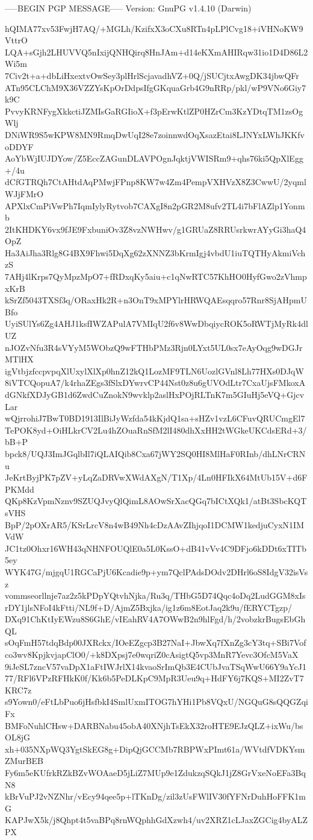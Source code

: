 -----BEGIN PGP MESSAGE-----
Version: GnuPG v1.4.10 (Darwin)

hQIMA77xv53FwjH7AQ/+MGLh/KzifxX3oCXu8RTn4pLPlCvg18+iVHNoKW9VttrO
LQA+sGjh2LHUVVQ5nIxijQNHQirq8HnJAm+d14eKXmAHIRqw31io1D4D86L2Wi5m
7Civ2t+a+dbLiHxextvOwSey3plHrlScjavadhVZ+0Q/jSUCjtxAwgDK34jbwQFr
ATn95CLChM9X36VZZYsKpOrDdpsIfgGKquaGrb4G9nRRp/pkl/wP9VNo6Giy7k9C
PvvyKRNFygXkkctiJZMIsGaRGIioX+f3pErwKtlZP0HZrCm3KzYDtqTM1zsOgWlj
DNiWR9S5wKPW8MN9RmqDwUqI28e7zoinnwdOqXsazEtai8LJNYxLWhJKKfvoDDYF
AoYbWjIUJDYow/Z5EccZAGunDLAVPOgnJqktjVWISRm9+qhs76ki5QpXlEgg+/4u
dCfGTRQh7CtAHtdAqPMwjFPnp8KW7w4Zm4PempVXHVzX8Z3CwwU/2yqmlWJjFMrO
APXlxCmPiVwPh7IqmIylyRytvob7CAXgI8n2pGR2M8ufv2TL4i7bFlAZlp1Yonmb
2ItKHDKY6vx9fJE9FxbuniOv3Z8vzNWHwv/g1GRUaZ8RRUsrkwrAYyGi3haQ4OpZ
Ha3AiJha3Rlg8G4BX9Fhwi5DqXg62zXNNZ3bKrmIgj4vbdU1iuTQTHyAkmiVchzS
7AHj4lKrps7QyMpzMpO7+fRDxqKy5aiu+c1qNwRTC57KhHO0HyfGwo2zVhmpxKrB
kSrZf5043TXSf3q/ORaxHk2R+n3OnT9xMPYlrHRWQAEsqqro57Rnr8SjAHpmUBfo
UyiSUlYs6Zg4AHJ1ksfIWZAPulA7VMIqU2f6v8WwDbqiycROK5oRWTjMyRk4dlUZ
nJOZvNfu3R4sVYyM5WObzQ9wFTHbPMz3Rjn0LYxt5UL0sx7eAyOqg9wDGJrMTlHX
igVtbjzfccpvpqXlUxylXlXp0hnZ12kQ1LozMF9TLN6UozlGVnl8Lh77HXs0DJqW
8iVTCQopuA7/k4rhaZEgs3fSlxDYwrvCP44Nst0z8u6gUVOdLtr7CxaUjsFMkoxA
dGNkfXDJyGB1d6ZwdCuZnokN9wvklp2aslHxPOjRLTnK7m5GIuHj5eVQ+GjcvLar
wQjrrohiJ7BwT0BD1913IlBiJyWzfda54kKjdQ1sa+sHZv1vzL6CFuvQRUCmgEl7
TePOK8yd+OiHLkrCV2Lu4hZOuaRnSfM2lI480dhXxHH2tWGkeUKCdsERd+3/bB+P
bpck8/UQJ3ImJGqlbIl7iQLAIQib8Cxa67jWY2SQ0HI8MlHaF0RInb/dhLNrCRNu
JeKrtByjPK7pZV+yLqZaDRVwXWdAXgN/T1Xp/4Ln0HFIkX64MtUb15V+d6FPKMdd
QKp8KzVpmNznv9SZUQJvyQlQimL8AOwSrXacQGq7bICtXQk1/atBt3SbcKQTsVHS
BpP/2pOXrAR5/KSrLrcV8n4wB49Nh4cDzAAvZIhjqoI1DCMW1kedjuCyxN1IMVdW
JC1tz0Ohxr16WH43qNHNFOUQlE0a5L0KssO+dB41vVv4C9DFjo6kDDt6xTITb5ey
WYK47G/mjgqU1RGCaPjU6Kcadie9p+ym7QclPAdsDOdv2DHrl6oS8IdgV32isVsz
vommseorllnje7az2z5kPDpYQtvhNjka/Ru3q/THbG5D74Qqc4oDq2LudGGM8xIs
rDY1jlsNFoI4kFtti/NL9f+D/AjmZ5Bxjka/ig1z6m8EotJaq2k9u/fERYCTgzp/
DXq91ChKtIyEWzu8S6GhE/vIEahRV4A7OWwB2n9hlFgd/h/2vobzkrBugsEbGhQL
sOqFmH57tdqBdp00JXRckx/IOeEZgcp3B27NaI+JbwXq7fXnZg3cY3tq+SBi7Vof
co3wv8KpjkvjapClO0/+k8DXpsj7e0wqriZ0cAsigtQ5vp3MnR7Yevc3OfcM5VaX
9iJeSL7zncV57vaDpX1aFtIWJrlX14kvaoSrImQb3E4CUbJvaTSqWwU66Y9aYcJ1
77/RFl6VPzRFHkK0f/Kk6b5PeDLKpC9MpR3Ueu9q+HdFY6j7KQS+MI2ZvT7KRC7z
s9Yown0/eFtLbPuo6jHsfbkI4SmlUxmITOG7hYHi1Pb8VQxU/NGQuG8sQQGZqiFx
BMFoNuhlCHsw+DARBNabu45obA40XNjhTsEkX32roHTE9EJzQLZ+ixWu/bsOL8jG
xh+035NXpWQ3YgtSkEG8g+DipQjGCCMb7RBPWxPImt61a/WVtdfVDKYsmZMurBEB
Fy6m5eKUfrkRZkBZvWOAaeD5jLiZ7MUp9e1ZdukzqSQkJ1jZ8GrVxeNoEFa3BqN8
kBrVuPJ2vNZNhr/vEcy94qee5p+lTKnDg/zil3zUsFWlIV30fYFNrDuhHoFFK1mG
KAPJwX5k/j8Qhpt4t5vaBPq8rnWQphhGdXzwh4/uv2XRZ1cLJaxZGCig4byALZPX
